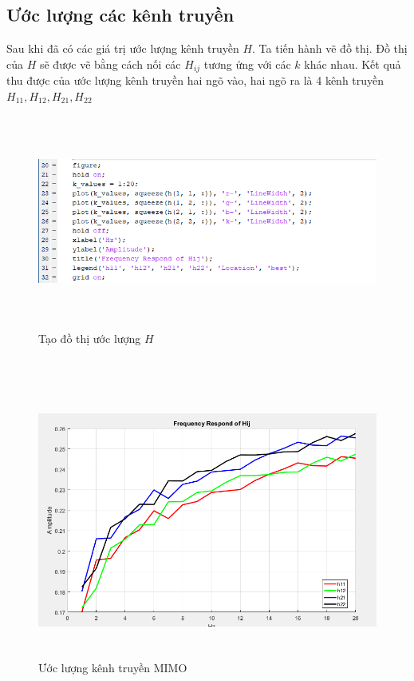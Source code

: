 \documentclass{article}
\begin{document}
\subsection{Ước lượng các kênh truyền}
Sau khi đã có các giá trị ước lượng kênh truyền $H$. Ta tiến hành vẽ đồ thị. Đồ thị của $H$ sẽ được vẽ bằng cách nối các $H_{ij}$ tương ứng với các $k$ khác nhau. Kết quả thu được của ước lượng kênh truyền hai ngõ vào, hai ngõ ra là 4 kênh truyền $H_{11},H_{12},H_{21},H_{22} $
\newpage
\begin{figure}[h!]
    \centering
    \includegraphics[width=14cm, height =7cm]{photo/8.2.1.png}
    \caption{Tạo đồ thị ước lượng $H$}
    \label{Hình 28}
\end{figure}\\
\begin{figure}[h!]
    \centering
    \includegraphics[width=14cm, height =9cm]{photo/8.2.2.png}
    \caption{Ước lượng kênh truyền MIMO}
    \label{Hình 29}
\end{figure}\\
\end{document}
